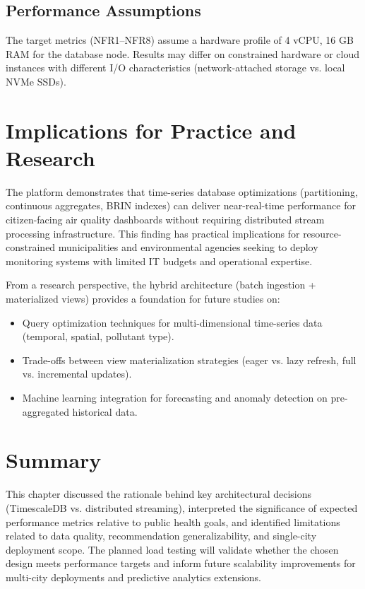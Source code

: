 \subsection{Performance Assumptions}
The target metrics (NFR1--NFR8) assume a hardware profile of 4 vCPU, 16 GB RAM for the database node. Results may differ on constrained hardware or cloud instances with different I/O characteristics (network-attached storage vs. local NVMe SSDs).

\section{Implications for Practice and Research}
\label{sec:implications}

The platform demonstrates that time-series database optimizations (partitioning, continuous aggregates, BRIN indexes) can deliver near-real-time performance for citizen-facing air quality dashboards without requiring distributed stream processing infrastructure. This finding has practical implications for resource-constrained municipalities and environmental agencies seeking to deploy monitoring systems with limited IT budgets and operational expertise.

From a research perspective, the hybrid architecture (batch ingestion + materialized views) provides a foundation for future studies on:
\begin{itemize}
    \item Query optimization techniques for multi-dimensional time-series data (temporal, spatial, pollutant type).
    \item Trade-offs between view materialization strategies (eager vs. lazy refresh, full vs. incremental updates).
    \item Machine learning integration for forecasting and anomaly detection on pre-aggregated historical data.
\end{itemize}

\section{Summary}
\label{sec:discussion_summary}

This chapter discussed the rationale behind key architectural decisions (TimescaleDB vs. distributed streaming), interpreted the significance of expected performance metrics relative to public health goals, and identified limitations related to data quality, recommendation generalizability, and single-city deployment scope. The planned load testing will validate whether the chosen design meets performance targets and inform future scalability improvements for multi-city deployments and predictive analytics extensions.